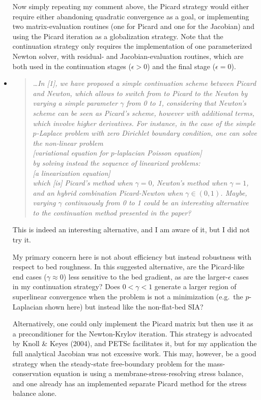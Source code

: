 \documentclass[11pt,reqno]{amsart}
\newcommand{\reply}[2]{
\medskip\medskip
\item  \begin{quote}
\emph{#1}
\end{quote}

\medskip
\noindent #2}
\begin{document}
\begin{itemize}
{Now simply repeating my comment above, the Picard strategy would either require either abandoning quadratic convergence as a goal, or implementing two matrix-evaluation routines (one for Picard and one for the Jacobian) and using the Picard iteration as a globalization strategy.  Note that the continuation strategy only requires the implementation of one parameterized Newton solver, with residual- and Jacobian-evaluation routines, which are both used in the continuation stages ($\epsilon>0$) and the final stage ($\epsilon=0$).}

\reply{\dots In [1], we have proposed a simple continuation scheme
between Picard and Newton, which allows to switch from to Picard to the Newton
by varying a simple parameter $\gamma$ from 0 to 1, considering that Newton’s scheme
can be seen as Picard’s scheme, however with additional terms, which involve
higher derivatives. For instance, in the case of the simple $p$-Laplace problem with
zero Dirichlet boundary condition, one can solve the non-linear problem \medskip \\
\phantom{foobar} [\emph{variational equation for $p$-laplacian Poisson equation}] \medskip \\
by solving instead the sequence of linearized problems: \medskip \\
\phantom{foobar} [\emph{a linearization equation}] \medskip \\
which [is] Picard's method when $\gamma=0$, Newton’s method when $\gamma=1$,
and an hybrid combination Picard-Newton when $\gamma \in (0,1)$.  Maybe, varying $\gamma$
continuously from 0 to 1 could be an interesting alternative to the continuation
method presented in the paper?}
{This is indeed an interesting alternative, and I am aware of it, but I did not try it.

My primary concern here is not about efficiency but instead robustness with respect to bed roughness.  In this suggested alternative, are the Picard-like end cases ($\gamma\approx 0$) less sensitive to the bed gradient, as are the larger-$\epsilon$ cases in my continuation strategy?  Does $0<\gamma<1$ generate a larger region of superlinear convergence when the problem is not a minimization (e.g.~the $p$-Laplacian shown here) but instead like the non-flat-bed SIA?

Alternatively, one could only implement the Picard matrix but then use it as a preconditioner for the Newton-Krylov iteration.  This strategy is advocated by Knoll \& Keyes (2004), and PETSc facilitates it, but for my application the full analytical Jacobian was not excessive work.  This may, however, be a good strategy when the steady-state free-boundary problem for the mass-conservation equation is using a membrane-stress-resolving stress balance, and one already has an implemented separate Picard method for the stress balance alone.}


\end{itemize}
\end{document}
